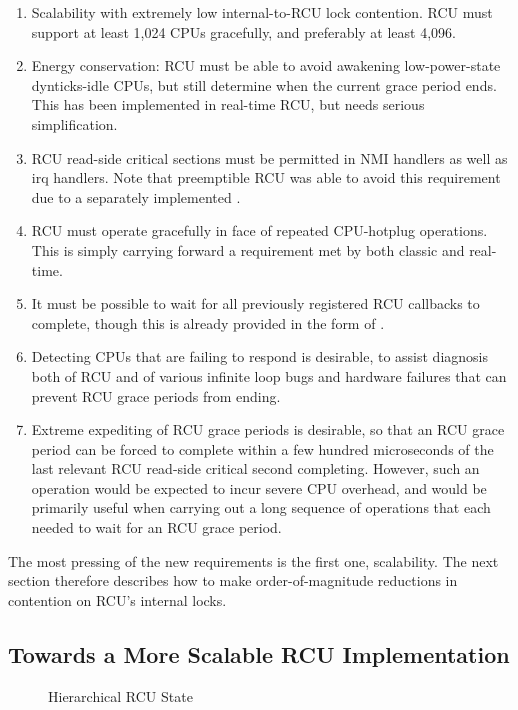 \begin{enumerate}
\item	Scalability with extremely low internal-to-RCU lock contention.
	RCU must support at least 1,024 CPUs gracefully, and preferably
	at least 4,096.
\item	Energy conservation: RCU must be able to avoid awakening
	low-power-state dynticks-idle CPUs, but still determine
	when the current grace period ends.
	This has been implemented in real-time RCU, but needs serious
	simplification.
\item	RCU read-side critical sections must be permitted in NMI
	handlers as well as irq handlers.  Note that preemptible RCU
	was able to avoid this requirement due to a separately
	implemented .
\item	RCU must operate gracefully in face of repeated CPU-hotplug
	operations.
	This is simply carrying forward a requirement met by both
	classic and real-time.
\item	It must be possible to wait for all previously registered
	RCU callbacks to complete, though this is already provided
	in the form of .
\item	Detecting CPUs that are failing to respond is desirable,
	to assist diagnosis both of RCU and of various infinite
	loop bugs and hardware failures that can prevent RCU grace
	periods from ending.
\item	Extreme expediting of RCU grace periods is desirable,
	so that an RCU grace period can be forced to complete within
	a few hundred microseconds of the last relevant RCU read-side
	critical second completing.
	However, such an operation would be expected to incur
	severe CPU overhead, and would be primarily useful when
	carrying out a long sequence of operations that each needed
	to wait for an RCU grace period.
\end{enumerate}

The most pressing of the new requirements is the first one, scalability.
The next section therefore describes how to make order-of-magnitude reductions
in contention on RCU's internal locks.

\subsection{Towards a More Scalable RCU Implementation}
\label{app:rcuimpl:rcutree:Towards a More Scalable RCU Implementation}

\begin{figure}[htb]
\centering
{}
\caption{Hierarchical RCU State}
\label{fig:app:rcuimpl:rcutree:Hierarchical RCU State}
\end{figure}

